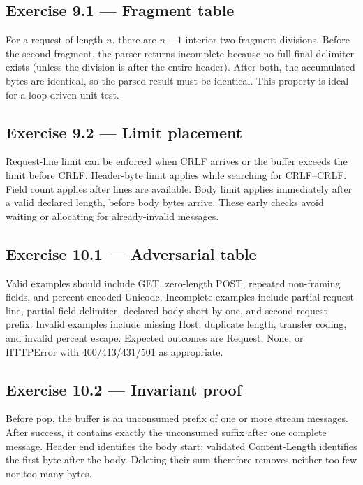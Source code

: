 \subsection*{Exercise 9.1 --- Fragment table}

For a request of length $n$, there are $n-1$ interior two-fragment divisions.
Before the second fragment, the parser returns incomplete because no full final
delimiter exists (unless the division is after the entire header). After both,
the accumulated bytes are identical, so the parsed result must be identical.
This property is ideal for a loop-driven unit test.

\subsection*{Exercise 9.2 --- Limit placement}

Request-line limit can be enforced when CRLF arrives or the buffer exceeds the
limit before CRLF. Header-byte limit applies while searching for CRLF--CRLF.
Field count applies after lines are available. Body limit applies immediately
after a valid declared length, before body bytes arrive. These early checks avoid
waiting or allocating for already-invalid messages.

\subsection*{Exercise 10.1 --- Adversarial table}

Valid examples should include GET, zero-length POST, repeated non-framing fields,
and percent-encoded Unicode. Incomplete examples include partial request line,
partial field delimiter, declared body short by one, and second request prefix.
Invalid examples include missing Host, duplicate length, transfer coding, and
invalid percent escape. Expected outcomes are Request, None, or HTTPError with
400/413/431/501 as appropriate.

\subsection*{Exercise 10.2 --- Invariant proof}

Before pop, the buffer is an unconsumed prefix of one or more stream messages.
After success, it contains exactly the unconsumed suffix after one complete
message. Header end identifies the body start; validated Content-Length identifies
the first byte after the body. Deleting their sum therefore removes neither too
few nor too many bytes.

